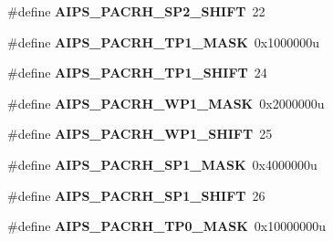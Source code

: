 \begin{DoxyCompactItemize}
\item 
\#define {\bfseries A\+I\+P\+S\+\_\+\+P\+A\+C\+R\+H\+\_\+\+S\+P2\+\_\+\+S\+H\+I\+FT}~22\hypertarget{group__AIPS__Register__Masks_gae4e8423c6cbf58ccab66d70b7202025b}{}\label{group__AIPS__Register__Masks_gae4e8423c6cbf58ccab66d70b7202025b}

\item 
\#define {\bfseries A\+I\+P\+S\+\_\+\+P\+A\+C\+R\+H\+\_\+\+T\+P1\+\_\+\+M\+A\+SK}~0x1000000u\hypertarget{group__AIPS__Register__Masks_ga7e2f01951998b670ee0b9e8fd3a1826f}{}\label{group__AIPS__Register__Masks_ga7e2f01951998b670ee0b9e8fd3a1826f}

\item 
\#define {\bfseries A\+I\+P\+S\+\_\+\+P\+A\+C\+R\+H\+\_\+\+T\+P1\+\_\+\+S\+H\+I\+FT}~24\hypertarget{group__AIPS__Register__Masks_ga352e2bf0f4332e0ac72ec0281c12e105}{}\label{group__AIPS__Register__Masks_ga352e2bf0f4332e0ac72ec0281c12e105}

\item 
\#define {\bfseries A\+I\+P\+S\+\_\+\+P\+A\+C\+R\+H\+\_\+\+W\+P1\+\_\+\+M\+A\+SK}~0x2000000u\hypertarget{group__AIPS__Register__Masks_gad57bca9c6a0696ff5ff69fb0095e1d40}{}\label{group__AIPS__Register__Masks_gad57bca9c6a0696ff5ff69fb0095e1d40}

\item 
\#define {\bfseries A\+I\+P\+S\+\_\+\+P\+A\+C\+R\+H\+\_\+\+W\+P1\+\_\+\+S\+H\+I\+FT}~25\hypertarget{group__AIPS__Register__Masks_ga2b431a34d1df62b2702605212d674116}{}\label{group__AIPS__Register__Masks_ga2b431a34d1df62b2702605212d674116}

\item 
\#define {\bfseries A\+I\+P\+S\+\_\+\+P\+A\+C\+R\+H\+\_\+\+S\+P1\+\_\+\+M\+A\+SK}~0x4000000u\hypertarget{group__AIPS__Register__Masks_ga8589686bfd42b91c287dade9448bccea}{}\label{group__AIPS__Register__Masks_ga8589686bfd42b91c287dade9448bccea}

\item 
\#define {\bfseries A\+I\+P\+S\+\_\+\+P\+A\+C\+R\+H\+\_\+\+S\+P1\+\_\+\+S\+H\+I\+FT}~26\hypertarget{group__AIPS__Register__Masks_gad2ed240b86e914d9651d23c7a82ba6dc}{}\label{group__AIPS__Register__Masks_gad2ed240b86e914d9651d23c7a82ba6dc}

\item 
\#define {\bfseries A\+I\+P\+S\+\_\+\+P\+A\+C\+R\+H\+\_\+\+T\+P0\+\_\+\+M\+A\+SK}~0x10000000u\hypertarget{group__AIPS__Register__Masks_ga19347470438077f9a7bb86277fb35b25}{}\label{group__AIPS__Register__Masks_ga19347470438077f9a7bb86277fb35b25}


\end{DoxyCompactItemize}
